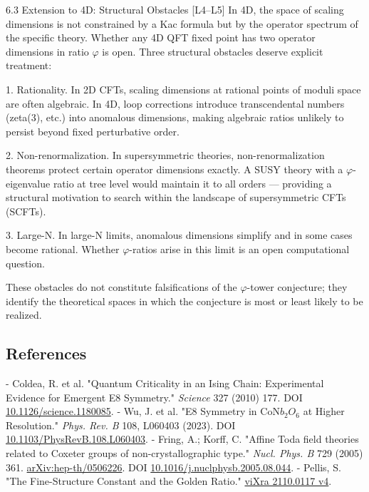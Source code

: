   6.3 Extension to 4D: Structural Obstacles [L4--L5]
  In 4D, the space of scaling dimensions is not constrained by a Kac formula but by the
  operator spectrum of the specific theory. Whether any 4D QFT fixed point has two
  operator dimensions in ratio $\varphi$ is open. Three structural obstacles deserve explicit
  treatment:

  1. Rationality. In 2D CFTs, scaling dimensions at rational points of moduli space are
  often algebraic. In 4D, loop corrections introduce transcendental numbers (zeta(3),
  etc.) into anomalous dimensions, making algebraic ratios unlikely to persist beyond
  fixed perturbative order.

  2. Non-renormalization. In supersymmetric theories, non-renormalization theorems
  protect certain operator dimensions exactly. A SUSY theory with a $\varphi$-eigenvalue ratio at
  tree level would maintain it to all orders --- providing a structural motivation to search
  within the landscape of supersymmetric CFTs (SCFTs).

  3. Large-N. In large-N limits, anomalous dimensions simplify and in some cases become
  rational. Whether $\varphi$-ratios arise in this limit is an open computational question.

  These obstacles do not constitute falsifications of the $\varphi$-tower conjecture; they identify
  the theoretical spaces in which the conjecture is most or least likely to be realized.

\subsection{References}

- Coldea, R. et al. "Quantum Criticality in an Ising Chain: Experimental Evidence for Emergent E8 Symmetry." \textit{Science} 327 (2010) 177. DOI \href{https://doi.org/10.1126/science.1180085}{10.1126/science.1180085}.
- Wu, J. et al. "E8 Symmetry in CoN$b_{2}$$O_{6}$ at Higher Resolution." \textit{Phys. Rev. B} 108, L060403 (2023). DOI \href{https://doi.org/10.1103/PhysRevB.108.L060403}{10.1103/PhysRevB.108.L060403}.
- Fring, A.; Korff, C. "Affine Toda field theories related to Coxeter groups of non-crystallographic type." \textit{Nucl. Phys. B} 729 (2005) 361. \href{https://arxiv.org/abs/hep-th/0506226}{arXiv:hep-th/0506226}. DOI \href{https://doi.org/10.1016/j.nuclphysb.2005.08.044}{10.1016/j.nuclphysb.2005.08.044}.
- Pellis, S. "The Fine-Structure Constant and the Golden Ratio." \href{https://vixra.org/pdf/2110.0117v4.pdf}{viXra 2110.0117 v4}.
